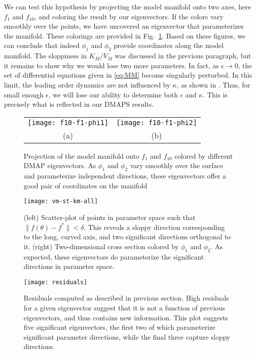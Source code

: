 We can test this hypothesis by projecting the model manifold onto two
axes, here $f_1$ and $f_{10}$, and coloring the result by our
eigenvectors. If the colors vary smoothly over the points, we have
uncovered an eigenvector that parameterizes the manifold. These
colorings are provided in Fig.~\ref{fig:mm-dmaps}. Based on these
figures, we can conclude that indeed $\phi_1$ and $\phi_2$ provide
coordinates along the model manifold. The sloppiness in $K_M/V_M$ was
discussed in the previous paragraph, but it remains to show why we
would lose two more parameters. In fact, as $\epsilon \rightarrow 0$,
the set of differential equations given in \eqref{eq:MM} become
singularly perturbed. In this limit, the leading order dynamics are
not influenced by $\kappa$, as shown in
\cite{segel_quasi-steady-state_1989}. Thus, for small enough
$\epsilon$, we will lose our ability to determine both $\epsilon$ and
$\kappa$. This is precisely what is reflected in our DMAPS results.

\begin{figure}[!htp]
  \centering
  \begin{tabular}{cc}
    \texttt{[image: f10-f1-phi1]} &
    \texttt{[image: f10-f1-phi2]}\\
    (a) & (b) \\
  \end{tabular}
  \caption[DMAPS results for Michaelis-Menten system I]{Projection of the model manifold onto $f_1$ and $f_{10}$
    colored by different DMAP eigenvectors. As $\phi_1$ and $\phi_2$
    vary smoothly over the surface and parameterize independent
    directions, these eigenvectors offer a good pair of coordinates on
    the manifold \label{fig:mm-dmaps}}
\end{figure}


\begin{figure}[ht!]
  \centering
  \texttt{[image: vm-st-km-all]}
  \caption[DMAPS results for Michaelis-Menten system II]{(left) Scatter-plot of points in parameter space such that
    $\|f(\theta) - f^*\| < \delta$. This reveals a sloppy direction
    corresponding to the long, curved axis, and two significant
    directions orthogonal to it. (right) Two-dimensional cross section
    colored by $\phi_1$ and $\phi_2$. As expected, these eigenvectors
    do parameterize the significant directions in parameter space.
    \label{fig:mm-all} }
\end{figure}

\begin{figure}
  \centering
  \texttt{[image: residuals]}
  \caption[DMAPS residuals from Michaelis-Menten system]{Residuals computed as described in previous section. High
    residuals for a given eigenvector suggest that it is not a
    function of previous eigenvectors, and thus contains new
    information. This plot suggests five significant eigenvectors, the
    first two of which parameterize significant parameter directions,
    while the final three capture sloppy
    directions. \label{fig:resids} }
\end{figure}

